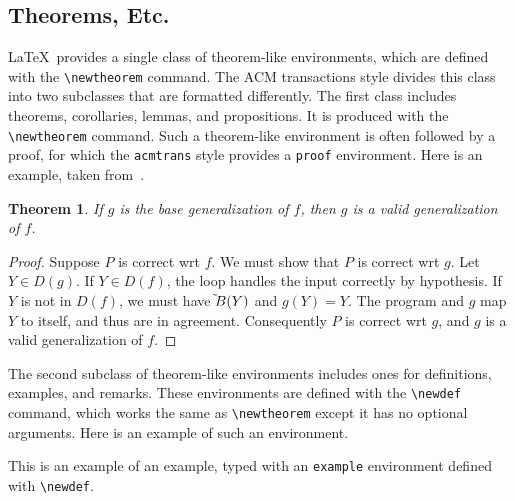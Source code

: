 \subsection{Theorems, Etc.}

\LaTeX\ provides a single class of theorem-like environments, which are
defined with the \verb|\newtheorem| command.  The ACM transactions
style divides this class into two subclasses that are formatted
differently.  The first class includes theorems, corollaries, lemmas,
and propositions.  It is produced with the \verb|\newtheorem| command.
Such a theorem-like environment is often followed by a proof, for which
the {\tt acmtrans} style provides a {\tt proof} environment.
Here is an example, taken from~.

\newtheorem{theorem}{Theorem}

\begin{theorem}
If $g$ is the base generalization of $f$, then $g$ is a valid
generalization of $f$.
\end{theorem}
\begin{proof}
Suppose $P$ is correct wrt $f$.  We must show that $P$ is correct
wrt $g$.  Let $Y\in D(g)$.  If $Y\in D(f)$, the loop handles the input
correctly by hypothesis.  If $Y$ is not in $D(f)$, we must have
$\tilde{\rule{0pt}{6pt}}B(Y)$ and $g(Y)=Y$.  The program and $g$ map
$Y$ to itself, and thus are in agreement.  Consequently $P$ is
correct wrt $g$, and $g$ is a valid generalization of $f$.
\end{proof}

The second subclass of theorem-like environments includes ones for
definitions, examples, and remarks.  These environments are defined
with the \verb|\newdef| command, which works the same as
\verb|\newtheorem| except it has no optional arguments.  Here
is an example of such an environment.



\begin{example}
This is an example of an example, typed with an {\tt example}
environment defined with \verb|\newdef|.
\end{example}


\newtheorem{property}{Property}

